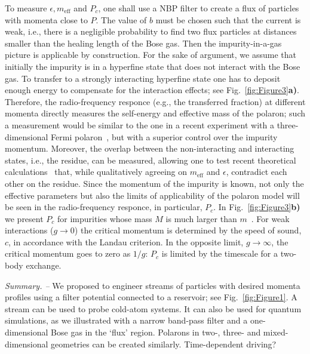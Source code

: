\documentclass[twocolumn,amsmath,amssymb,showpacs,prl,superscriptaddress,aps]{revtex4-1}
\begin{document}
To measure $\epsilon, m_{\mathrm{eff}}$ and $P_c$, one shall use a NBP filter to create a flux of particles 
with momenta close to $P$. The value of $b$ must be chosen such that the current is weak, i.e., 
there is a negligible probability to find two flux particles at distances smaller than the healing 
length of the Bose gas. Then the impurity-in-a-gas picture is applicable by construction. 
For the sake of argument, we assume that initially the impurity is in a hyperfine state 
that does not interact with the Bose gas. To transfer to a strongly interacting hyperfine state 
one has to deposit enough energy to compensate for the interaction effects; see Fig.~\ref{fig:Figure3}{\bf a)}. 
Therefore, the radio-frequency responce (e.g., the transferred fraction) at different momenta directly measures 
the self-energy and effective mass of the polaron;
such a measurement would be similar to the one in a recent experiment with a three-dimensional Fermi polaron~\cite{zaccanti2017}, but 
with a superior control over the impurity momentum. 
Moreover, the overlap between the non-interacting and interacting states, i.e., the residue, can
be measured, allowing one to test recent theoretical calculations~\cite{volosniev2017, pastukhov2017,grusdt2017,pastukhov2018}
that, while qualitatively agreeing on $m_{\mathrm{eff}}$ and $\epsilon$, contradict each other on the residue.
Since the momentum of the impurity is known, not only the effective parameters but also the limits of applicability 
of the polaron model will be seen in the radio-frequency responce, in particular, $P_c$.
In Fig.~\ref{fig:Figure3}{\bf b)} we present $P_c$ for impurities whose mass $M$ is much larger than $m$~\cite{hakim1997}.
For weak interactions ($g\to 0$) the critical momentum is determined by the speed of sound, $c$, in accordance with the Landau criterion.
In the opposite limit, $g\to \infty$, the critical momentum goes to zero as $1/g$:   
$P_c$ is limited by the timescale for a two-body exchange. 
 



{\it Summary. --}  We proposed to engineer streams of particles with desired momenta profiles
using a filter potential connected to a reservoir; see Fig.~\ref{fig:Figure1}.
A stream can be used to probe cold-atom systems. It can also be used for quantum simulations, as we illustrated 
with a narrow band-pass filter and a one-dimensional Bose gas in the `flux' region. 
Polarons in two-, three- and mixed-dimensional geometries can be created similarly. 
{\color{red} Time-dependent driving?} 
\end{document}
